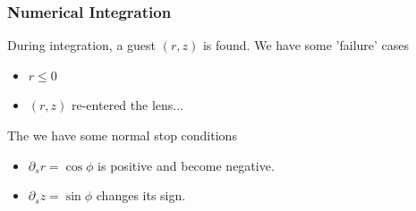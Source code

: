 \documentclass[aps,onecolumn]{revtex4}
\begin{document}
\subsubsection{Numerical Integration}
During integration, a guest $(r,z)$ is found.
We have some 'failure' cases
\begin{itemize}
\item $r\leq0$
\item $(r,z)$ re-entered the lens...
\end{itemize}

The we have some normal stop conditions
\begin{itemize}
\item $\partial_s r = \cos \phi$ is positive and become negative.
\item $\partial_s z = \sin \phi$ changes its sign.
\end{itemize}
\end{document}
